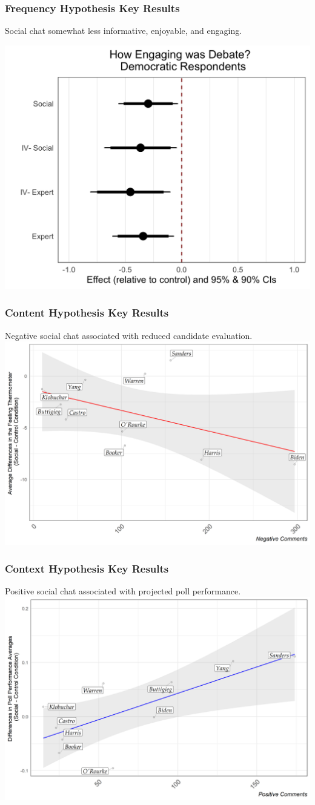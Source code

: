 \documentclass{beamer}
\begin{document}
\begin{frame}
\frametitle{Frequency Hypothesis Key Results}

Social chat somewhat less informative, enjoyable, and engaging.

\centering
	\includegraphics[width=.8\linewidth]{engaging_dem.png}

\end{frame}



\begin{frame}
\frametitle{Content Hypothesis Key Results}
Negative social chat associated with reduced candidate evaluation.
\includegraphics[width=.8\linewidth]{ft_on_negative_comments.png}
\end{frame}

\begin{frame}
\frametitle{Context Hypothesis Key Results}
Positive social chat associated with projected poll performance.
\includegraphics[width=.8\linewidth]{polls_on_positive_comments.png}
\end{frame}
\end{document}
